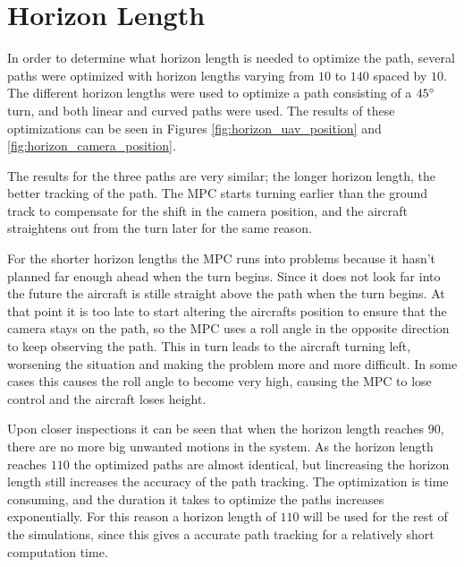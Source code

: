 \section{Horizon Length}

In order to determine what horizon length is needed to optimize the path, several paths were optimized with horizon lengths varying from $10$ to $140$ spaced by $10$. The different horizon lengths were used to optimize a path consisting of a $45\degree$ turn, and both linear and curved paths were used. The results of these optimizations can be seen in Figures \ref{fig:horizon_uav_position} and \ref{fig:horizon_camera_position}.

The results for the three paths are very similar; the longer horizon length, the better tracking of the path. The MPC starts turning earlier than the ground track to compensate for the shift in the camera position, and the aircraft straightens out from the turn later for the same reason.

For the shorter horizon lengths the MPC runs into problems because it hasn't planned far enough ahead when the turn begins. Since it does not look far into the future the aircraft is stille straight above the path when the turn begins. At that point it is too late to start altering the aircrafts position to ensure that the camera stays on the path, so the MPC uses a roll angle in the opposite direction to keep observing the path. This in turn leads to the aircraft turning left, worsening the situation and making the problem more and more difficult. In some cases this causes the roll angle to become very high, causing the MPC to lose control and the aircraft loses height.

Upon closer inspections it can be seen that when the horizon length reaches $90$, there are no more big unwanted motions in the system. As the horizon length reaches $110$ the optimized paths are almost identical, but lincreasing the horizon length still increases the accuracy of the path tracking. The optimization is time consuming, and the duration it takes to optimize the paths increases exponentially. For this reason a horizon length of $110$ will be used for the rest of the simulations, since this gives a accurate path tracking for a relatively short computation time.

